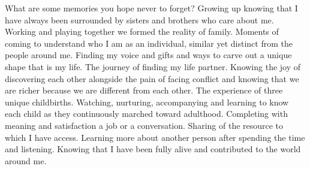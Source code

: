 What are some memories you hope never to forget?
Growing up knowing that I have always been surrounded by sisters and brothers who care about me. Working and playing together we formed the reality of family.
Moments of coming to understand who I am as an individual, similar yet distinct from the people around me. Finding my voice and gifts and ways to carve out a unique shape that is my life.
The journey of finding my life partner. Knowing the joy of discovering each other alongside the pain of facing conflict and knowing that we are richer because we are different from each other.
The experience of three unique childbirths. Watching, nurturing, accompanying and learning to know each child as they continuously marched toward adulthood. 
Completing with meaning and satisfaction a job or a conversation. 
Sharing of the resource to which I have access.
Learning more about another person after spending the time and listening.
Knowing that I have been fully alive and contributed to the world around me.





